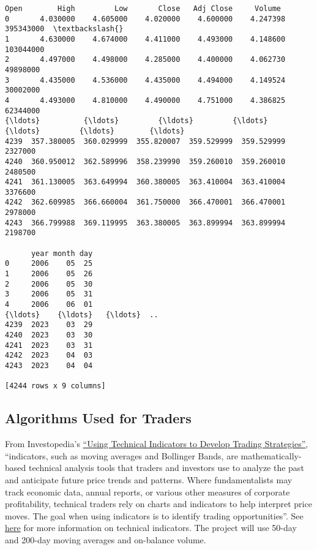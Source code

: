 \documentclass[11pt]{article}
\makeatletter
\newcommand{\boxspacing}{\kern\kvtcb@left@rule\kern\kvtcb@boxsep}
\newcommand{\prompt}[4]{
        {\ttfamily\llap{{\color{#2}[#3]:\hspace{3pt}#4}}\vspace{-\baselineskip}}
    }
\makeatother
\begin{document}
            \begin{tcolorbox}[breakable, size=fbox, boxrule=.5pt, pad at break*=1mm, opacityfill=0]
\prompt{Out}{outcolor}{8}{\boxspacing}
\begin{Verbatim}[commandchars=\\\{\}]
            Open        High         Low       Close   Adj Close     Volume
0       4.030000    4.605000    4.020000    4.600000    4.247398  395343000  \textbackslash{}
1       4.630000    4.674000    4.411000    4.493000    4.148600  103044000
2       4.497000    4.498000    4.285000    4.400000    4.062730   49898000
3       4.435000    4.536000    4.435000    4.494000    4.149524   30002000
4       4.493000    4.810000    4.490000    4.751000    4.386825   62344000
{\ldots}          {\ldots}         {\ldots}         {\ldots}         {\ldots}         {\ldots}        {\ldots}
4239  357.380005  360.029999  355.820007  359.529999  359.529999    2327000
4240  360.950012  362.589996  358.239990  359.260010  359.260010    2480500
4241  361.130005  363.649994  360.380005  363.410004  363.410004    3376600
4242  362.609985  366.660004  361.750000  366.470001  366.470001    2978000
4243  366.799988  369.119995  363.380005  363.899994  363.899994    2198700

      year month day
0     2006    05  25
1     2006    05  26
2     2006    05  30
3     2006    05  31
4     2006    06  01
{\ldots}    {\ldots}   {\ldots}  ..
4239  2023    03  29
4240  2023    03  30
4241  2023    03  31
4242  2023    04  03
4243  2023    04  04

[4244 rows x 9 columns]
\end{Verbatim}
\end{tcolorbox}
        
    \hypertarget{algorithms-used-for-traders}{%
\subsection{Algorithms Used for
Traders}\label{algorithms-used-for-traders}}

From Investopedia's
\href{https://www.investopedia.com/articles/trading/11/indicators-and-strategies-explained.asp}{``Using
Technical Indicators to Develop Trading Strategies''}, ``indicators,
such as moving averages and Bollinger Bands, are mathematically-based
technical analysis tools that traders and investors use to analyze the
past and anticipate future price trends and patterns. Where
fundamentalists may track economic data, annual reports, or various
other measures of corporate profitability, technical traders rely on
charts and indicators to help interpret price moves. The goal when using
indicators is to identify trading opportunities''. See
\href{https://www.investopedia.com/terms/t/technicalindicator.asp}{here}
for more information on technical indicators. The project will use
50-day and 200-day moving averages and on-balance volume.
\end{document}
